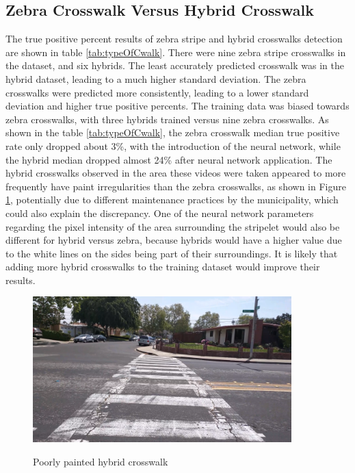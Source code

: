 \documentclass[12pt]{ucthesis}
\newcommand{\captionfonts}{\small\bf\ssp}
\begin{document}
\subsection{Zebra Crosswalk Versus Hybrid Crosswalk}

The true positive percent results of zebra stripe and hybrid crosswalks detection are shown in table \ref{tab:typeOfCwalk}. There were nine zebra stripe crosswalks in the dataset, and six hybrids. The least accurately predicted crosswalk was in the hybrid dataset, leading to a much higher standard deviation. The zebra crosswalks were predicted more consistently, leading to a lower standard deviation and higher true positive percents. The training data was biased towards zebra crosswalks, with three hybrids trained versus nine zebra crosswalks. As shown in the table \ref{tab:typeOfCwalk}, the zebra crosswalk median true positive rate only dropped about 3\%, with the introduction of the neural network, while the hybrid median dropped almost 24\% after neural network application. The hybrid crosswalks observed in the area these videos were taken appeared to more frequently have paint irregularities than the zebra crosswalks, as shown in Figure \ref{fig:poorlyPaintedHybrid}, potentially due to different maintenance practices by the municipality, which could also explain the discrepancy. One of the neural network parameters regarding the pixel intensity of the area surrounding the stripelet would also be different for hybrid versus zebra, because hybrids would have a higher value due to the white lines on the sides being part of their surroundings. It is likely that adding more hybrid crosswalks to the training dataset would improve their results.

\begin{figure}[t]
\begin{center}
\includegraphics[width=10cm]{PoorlyPaintedHybrid.png}
\captionfonts
\caption[Poorly Painted Hybrid Crosswalk]{Poorly painted hybrid crosswalk}
\label{fig:poorlyPaintedHybrid}
\end{center}
\end{figure}
\end{document}
